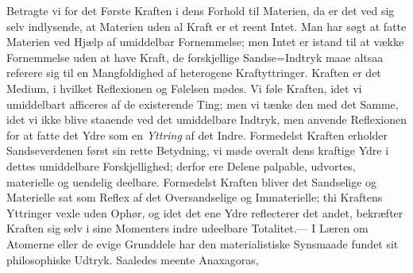 \documentclass[12pt]{book}
\newcommand{\opage}[1]{\marginnote{\footnotesize\textit{[#1]}}}
\begin{document}
Betragte vi for det Første Kraften i dens Forhold til Materien, da er det ved sig selv
indlysende, at Materien uden al Kraft er et reent Intet. Man har søgt at fatte Materien ved
Hjælp af umiddelbar Fornemmelse; men Intet er istand til at vække Fornemmelse uden at have
Kraft, de forskjellige
\opage{139} %
Sandse=Indtryk maae altsaa referere sig til en Mangfoldighed af heterogene Kraftyttringer.
Kraften er det Medium, i hvilket Reflexionen og Følelsen mødes. Vi føle Kraften, idet vi
umiddelbart afficeres af de existerende Ting; men vi tænke den med det Samme, idet vi ikke blive
staaende ved det umiddelbare Indtryk, men anvende Reflexionen for at fatte det Ydre som en
\emph{Yttring} af det Indre. Formedelst Kraften erholder Sandseverdenen først sin rette
Betydning, vi møde overalt dens kraftige Ydre i dettes umiddelbare Forskjellighed; derfor ere
Delene palpable, udvortes, materielle og uendelig deelbare. Formedelst Kraften bliver det
Sandselige og Materielle sat som Reflex af det Oversandselige og Immaterielle; thi Kraftens
Yttringer vexle uden Ophør, og idet det ene Ydre reflecterer det andet, bekræfter Kraften sig
selv i sine Momenters indre udeelbare Totalitet.--- I Læren om Atomerne eller de evige Grunddele
har den materialistiske Synsmaade fundet sit philosophiske Udtryk. Saaledes meente Anaxagoras,
\end{document}
